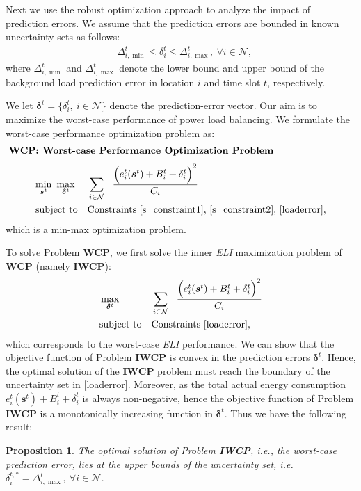 \documentclass[journal]{IEEEtran}
\newtheorem{proposition}{Proposition}
\begin{document}
	Next we use the robust optimization approach \cite{worst-case} to analyze the impact of prediction errors. We assume that the prediction errors are bounded in known uncertainty sets as follows:
	\begin{align}
	&  \Delta_{i,\min}^{t} \leq \delta_{i}^{t} \leq \Delta_{i, \max}^{t},~\forall i \in \mathcal{N}, \label{loaderror}
	\end{align}
	where $\Delta_{i,\min}^{t}$ and $\Delta_{i, \max}^{t}$ denote the lower bound and upper bound of the background load prediction error in location $i$ and time slot $t$, respectively.
	
	We let $\boldsymbol{\delta}^{t} = \{ \delta_{i}^{t},~ i \in \mathcal{N} \}$ denote the prediction-error vector. Our aim is to maximize the worst-case performance of power load balancing. We formulate the worst-case performance optimization problem as:
	\begin{align*}
	& \leftline{\textbf{WCP: Worst-case Performance Optimization Problem}}
	\end{align*}
	\begin{equation*}
	\begin{aligned}
	& \underset{\boldsymbol{s}^{t}} {\min} ~\max_{\boldsymbol{\delta}^{t}}
	& & \sum_{i \in \mathcal{N}}~~   \frac{ \Big( e_{i}^{t}(\boldsymbol{s}^{t})+B_{i}^{t} + \delta_{i}^{t} \Big)^{2} }{C_i} \\
	& \text{subject to}
	& & \text{Constraints \eqref{s_constraint1}, \eqref{s_constraint2}, \eqref{loaderror}},
	\end{aligned}
	\end{equation*}
	which is a min-max optimization problem. 
		
	To solve Problem \textbf{WCP}, we first solve the inner \emph{ELI} maximization problem of \textbf{WCP} (namely \textbf{IWCP}):
	\begin{equation*}
	\begin{aligned}
	& \max_{\boldsymbol{\delta}^{t}}
	& & \sum_{i \in \mathcal{N}}~~   \frac{ \Big( e_{i}^{t}(\boldsymbol{s}^{t})+B_{i}^{t} + \delta_{i}^{t} \Big)^{2} }{C_i} \\
	& \text{subject to}
	& & \text{Constraints \eqref{loaderror}},
	\end{aligned}
	\end{equation*}	
	which corresponds to the worst-case \emph{ELI} performance. We can show that the objective function of Problem \textbf{IWCP} is convex in the prediction errors $\boldsymbol{\delta}^{t}$. Hence, the optimal solution of the \textbf{IWCP} problem must reach the boundary of the uncertainty set in \eqref{loaderror}. Moreover, as the total actual energy consumption $e_{i}^{t}(\boldsymbol{s}^{t})+B_{i}^{t} + \delta_{i}^{t}$ is always non-negative, hence the objective function of Problem \textbf{IWCP} is a monotonically increasing function in $\boldsymbol{\delta}^{t}$. Thus we have the following result:
	\begin{proposition}
		The optimal solution of Problem \textbf{IWCP}, \emph{i.e.}, the worst-case prediction error, lies at the upper bounds of the uncertainty set, \emph{i.e.} $\delta_i^{t,\ast} = \Delta_{i,\max}^{t},~\forall i \in \mathcal{N} $.
	\end{proposition}
    
\end{document}
